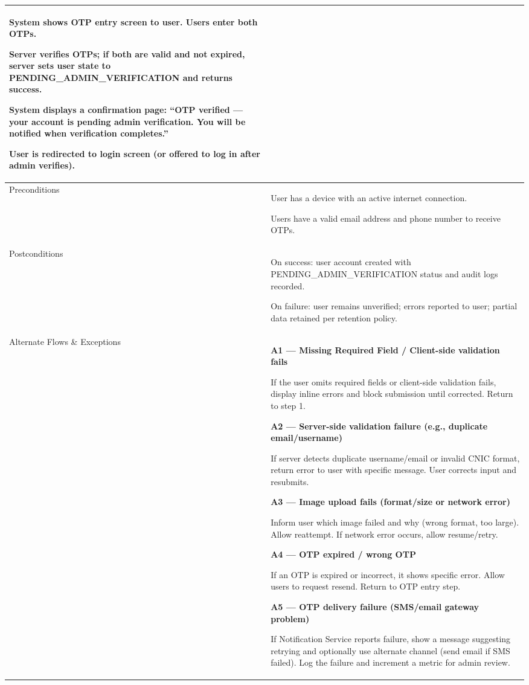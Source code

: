\begin{longtable}{|p{3.5cm}|p{12cm}|}
System shows OTP entry screen to user. Users enter both OTPs.

Server verifies OTPs; if both are valid and not expired, server sets user state to PENDING\_ADMIN\_VERIFICATION and returns success.

System displays a confirmation page: ``OTP verified --- your account is pending admin verification. You will be notified when verification completes.''

User is redirected to login screen (or offered to log in after admin verifies). \\
\hline
Preconditions & 
User has a device with an active internet connection.

Users have a valid email address and phone number to receive OTPs. \\
\hline
Postconditions & 
On success: user account created with PENDING\_ADMIN\_VERIFICATION status and audit logs recorded.

On failure: user remains unverified; errors reported to user; partial data retained per retention policy. \\
\hline
Alternate Flows \& Exceptions & 
\textbf{A1 --- Missing Required Field / Client-side validation fails}

If the user omits required fields or client-side validation fails, display inline errors and block submission until corrected. Return to step 1.

\textbf{A2 --- Server-side validation failure (e.g., duplicate email/username)}

If server detects duplicate username/email or invalid CNIC format, return error to user with specific message. User corrects input and resubmits.

\textbf{A3 --- Image upload fails (format/size or network error)}

Inform user which image failed and why (wrong format, too large). Allow reattempt. If network error occurs, allow resume/retry.

\textbf{A4 --- OTP expired / wrong OTP}

If an OTP is expired or incorrect, it shows specific error. Allow users to request resend. Return to OTP entry step.

\textbf{A5 --- OTP delivery failure (SMS/email gateway problem)}

If Notification Service reports failure, show a message suggesting retrying and optionally use alternate channel (send email if SMS failed). Log the failure and increment a metric for admin review.


\end{longtable}
